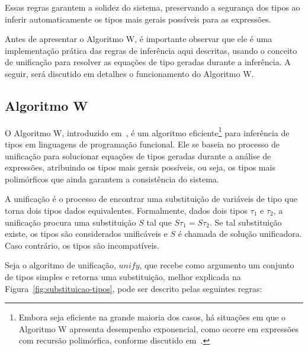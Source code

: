 Essas regras garantem a solidez do sistema, preservando a segurança dos tipos ao inferir automaticamente os tipos mais gerais possíveis para as expressões.

Antes de apresentar o Algoritmo W, é importante observar que ele é uma implementação prática das regras de inferência aqui descritas, usando o conceito de unificação para resolver as equações de tipo geradas durante a inferência.
A seguir, será discutido em detalhes o funcionamento do Algoritmo W.

\subsection{Algoritmo W}\label{subsec:w-algo}

O Algoritmo W, introduzido em~, é um algoritmo eficiente\footnote{Embora seja eficiente na grande maioria dos casos, há situações em que o Algoritmo W apresenta desempenho exponencial, como ocorre em expressões com recursão polimórfica, conforme discutido em~\cite{CRISTIANO2004}.} para inferência de tipos em linguagens de programação funcional.
Ele se baseia no processo de unificação para solucionar equações de tipos geradas durante a análise de expressões, atribuindo os tipos mais gerais possíveis, ou seja, os tipos mais polimórficos que ainda garantem a consistência do sistema.

A unificação é o processo de encontrar uma substituição de variáveis de tipo que torna dois tipos dados equivalentes.
Formalmente, dados dois tipos $\tau_1$ e $\tau_2$, a unificação procura uma substituição $S$ tal que $S\tau_1 = S\tau_2$.
Se tal substituição existe, os tipos são considerados unificáveis e $S$ é chamada de solução unificadora.
Caso contrário, os tipos são incompatíveis.

Seja o algoritmo de unificação, $unify$, que recebe como argumento um conjunto de tipos simples e retorna uma substituição, melhor explicada na Figura~\ref{fig:substituicao-tipos}, pode ser descrito pelas seguintes regras:

